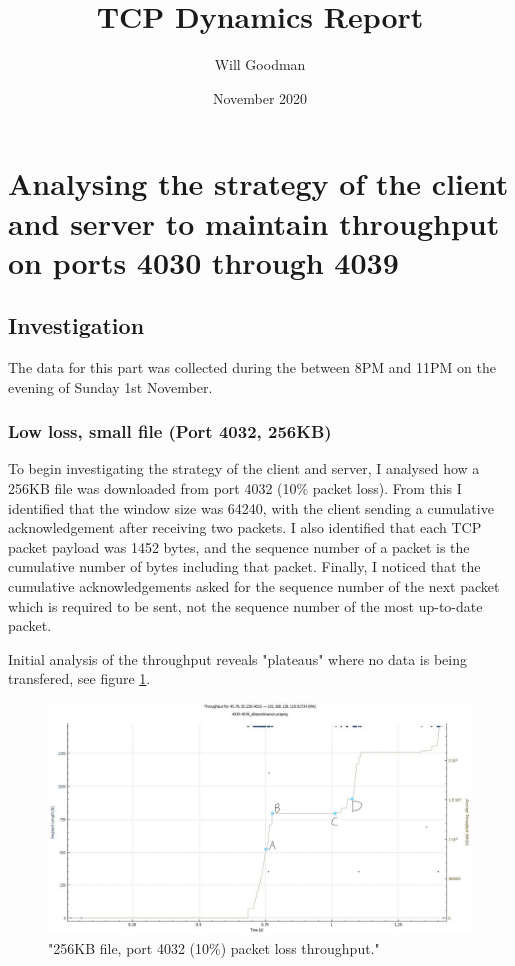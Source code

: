 \documentclass[12pt]{article}
\title{TCP Dynamics Report}
\date{November 2020}
\author{Will Goodman}
\begin{document}
\maketitle

\section{Analysing the strategy of the client and server to maintain throughput on ports 4030 through 4039}
\subsection*{Investigation}
The data for this part was collected during the between 8PM and 11PM on the evening of Sunday 1st November.

\subsubsection*{Low loss, small file (Port 4032, 256KB)}
To begin investigating the strategy of the client and server, I analysed how a 256KB file was downloaded from port 4032 (10\% packet loss).
From this I identified that the window size was 64240, with the client sending a cumulative acknowledgement after receiving two packets.
I also identified that each TCP packet payload was 1452 bytes, and the sequence number of a packet is the cumulative number of bytes including that packet.
Finally, I noticed that the cumulative acknowledgements asked for the sequence number of the next packet which is required to be sent, not the sequence number of the most up-to-date packet.

Initial analysis of the throughput reveals "plateaus" where no data is being transfered, see figure \ref{figure1: 4032:256KB Throughput}.

\begin{figure}[!htbp]
  \centering
  \includegraphics[scale=0.3]{4032_256KB_throughput-marked-points.jpg}
  \caption{"256KB file, port 4032 (10\%) packet loss throughput."}
  \label{figure1: 4032:256KB Throughput}
\end{figure}
\end{document}
